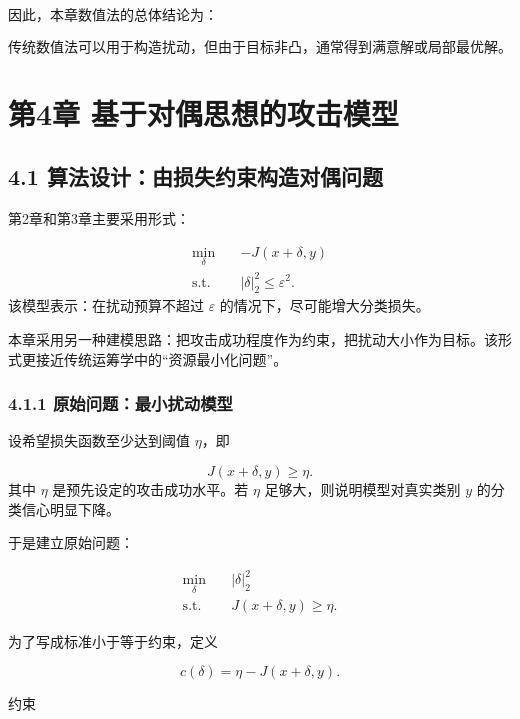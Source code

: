 ﻿\documentclass[UTF8,zihao=-4,fontset=none]{ctexart}
\begin{document}
因此，本章数值法的总体结论为：

\[
\text{传统数值法可以用于构造扰动，但由于目标非凸，通常得到满意解或局部最优解。}
\]

\clearpage
\section*{第4章 基于对偶思想的攻击模型}
{}

\subsection*{4.1 算法设计：由损失约束构造对偶问题}
{}

第2章和第3章主要采用形式：

\[
\begin{aligned}
\min_{\delta}
\quad
&
-J(x+\delta,y)\\
\mathrm{s.t.}
\quad
&
|\delta|_2^2\le \varepsilon^2.
\end{aligned}
\]
\noindent 该模型表示：在扰动预算不超过 \(\varepsilon\) 的情况下，尽可能增大分类损失。

本章采用另一种建模思路：把攻击成功程度作为约束，把扰动大小作为目标。该形式更接近传统运筹学中的“资源最小化问题”。

\subsubsection*{4.1.1 原始问题：最小扰动模型}
{}

设希望损失函数至少达到阈值 \(\eta\)，即

\[
J(x+\delta,y)\ge \eta.
\]
\noindent 其中 \(\eta\) 是预先设定的攻击成功水平。若 \(\eta\) 足够大，则说明模型对真实类别 \(y\) 的分类信心明显下降。

于是建立原始问题：

\[
\begin{aligned}
\min_{\delta}
\quad
&
|\delta|_2^2\\
\mathrm{s.t.}
\quad
&
J(x+\delta,y)\ge \eta.
\end{aligned}
\]

为了写成标准小于等于约束，定义

\[
c(\delta)=\eta-J(x+\delta,y).
\]

约束
\end{document}
